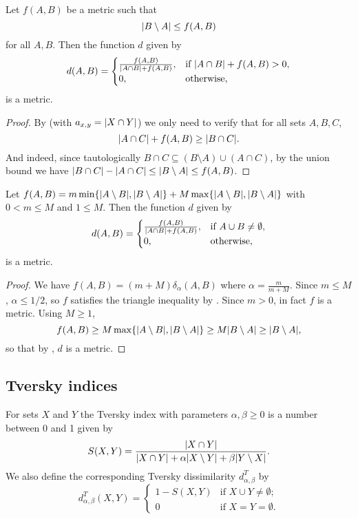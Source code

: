 		\begin{theorem}\label{mar29-22-11am}
			Let $f(A,B)$ be a metric such that
			\[
				\lvert B\setminus A\rvert\le f(A,B)
			\] for all $A,B$. Then the function $d$ given by
			\[
				d(A,B)=\begin{cases}
				\frac{f(A,B)}{\lvert A\cap B\rvert+f(A,B)},&\text{if }\lvert A\cap B\rvert+f(A,B)>0,\\
				0,&\text{otherwise},
				\end{cases}
			\]
			is a metric.
		\end{theorem}
		\begin{proof}
			By  (with $a_{x,y}=\lvert X\cap Y\rvert$) we only need to verify that for all sets $A,B,C$,
			\[
			\lvert A\cap C\rvert+f(A,B)\ge \lvert B\cap C\rvert.
			\]
			And indeed, since tautologically $B\cap C\subseteq (B\setminus A)\cup (A\cap C)$, by the union bound we have
		$\lvert B\cap C\rvert-\lvert A\cap C\rvert\le \lvert B\setminus A\rvert\le f(A,B)$.
		\end{proof}
		\begin{theorem}\label{too-similar}
			Let $f(A,B)=m\min\{\lvert A\setminus B\rvert,\lvert B\setminus A\rvert\}+M\max\{\lvert A\setminus B\rvert,\lvert B\setminus A\rvert\}$ with $0<m\le M$ and $1\le M$.
			Then the function $d$ given by
			\[
			d(A,B)=
			\begin{cases}
				\frac{f(A,B)}{\lvert A\cap B\rvert+ f(A,B)},&\text{if } A\cup B\ne\emptyset,\\
				0,&\text{otherwise},
			\end{cases}
			\]
			is a metric.
		\end{theorem}
		\begin{proof}
			We have
			$f(A,B)=(m+M) \delta_{\alpha}(A,B)$ where $\alpha=\frac{m}{m+M}$. Since $m\le M$, $\alpha\le 1/2$, so $f$ satisfies the triangle inequality by .
			Since $m>0$, in fact $f$ is a metric.
			Using $M\ge 1$,
			\[f(A,B)\ge M\max\{\lvert A\setminus B\rvert,\lvert B\setminus A\rvert\}\ge M \lvert B\setminus A\rvert\ge \lvert B\setminus A\rvert,
			\]
			so that by , $d$ is a metric.
		\end{proof}
	\subsection{Tversky indices}

		\begin{definition}\label{unsymm}
			For sets $X$ and $Y$ the Tversky index with parameters $\alpha,\beta\ge 0$ is a number between 0 and 1 given by
			\[
				S(X, Y) = \frac{\lvert X \cap Y\rvert}{\lvert X \cap Y\rvert + \alpha\lvert X \setminus Y\rvert + \beta\lvert Y \setminus X\rvert}.
			\]
			We also define the corresponding Tversky dissimilarity $d^T_{\alpha,\beta}$ by
			\[
				d^{T}_{\alpha,\beta}(X,Y) = 
				\begin{cases}
					1-S(X,Y)&\text{if }X\cup Y\ne\emptyset;\\
					0&\text{if }X=Y=\emptyset.
				\end{cases}
			\]
		\end{definition}

